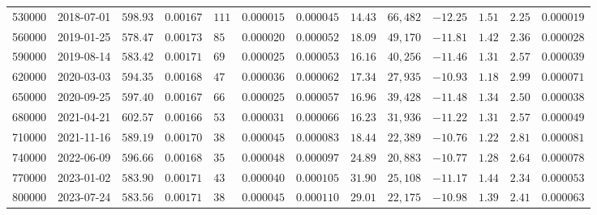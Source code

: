 \begin{tabular}{rllllllllllll}
\toprule
\midrule
530000 & 2018-07-01 & $598.93$ & $0.00167$ & $111$ & $0.000015$ & $0.000045$ & $14.43$ & $66,482$ & $-12.25$ & $1.51$ & $2.25$ & $0.000019$ \\
560000 & 2019-01-25 & $578.47$ & $0.00173$ & $85$ & $0.000020$ & $0.000052$ & $18.09$ & $49,170$ & $-11.81$ & $1.42$ & $2.36$ & $0.000028$ \\
590000 & 2019-08-14 & $583.42$ & $0.00171$ & $69$ & $0.000025$ & $0.000053$ & $16.16$ & $40,256$ & $-11.46$ & $1.31$ & $2.57$ & $0.000039$ \\
620000 & 2020-03-03 & $594.35$ & $0.00168$ & $47$ & $0.000036$ & $0.000062$ & $17.34$ & $27,935$ & $-10.93$ & $1.18$ & $2.99$ & $0.000071$ \\
650000 & 2020-09-25 & $597.40$ & $0.00167$ & $66$ & $0.000025$ & $0.000057$ & $16.96$ & $39,428$ & $-11.48$ & $1.34$ & $2.50$ & $0.000038$ \\
680000 & 2021-04-21 & $602.57$ & $0.00166$ & $53$ & $0.000031$ & $0.000066$ & $16.23$ & $31,936$ & $-11.22$ & $1.31$ & $2.57$ & $0.000049$ \\
710000 & 2021-11-16 & $589.19$ & $0.00170$ & $38$ & $0.000045$ & $0.000083$ & $18.44$ & $22,389$ & $-10.76$ & $1.22$ & $2.81$ & $0.000081$ \\
740000 & 2022-06-09 & $596.66$ & $0.00168$ & $35$ & $0.000048$ & $0.000097$ & $24.89$ & $20,883$ & $-10.77$ & $1.28$ & $2.64$ & $0.000078$ \\
770000 & 2023-01-02 & $583.90$ & $0.00171$ & $43$ & $0.000040$ & $0.000105$ & $31.90$ & $25,108$ & $-11.17$ & $1.44$ & $2.34$ & $0.000053$ \\
800000 & 2023-07-24 & $583.56$ & $0.00171$ & $38$ & $0.000045$ & $0.000110$ & $29.01$ & $22,175$ & $-10.98$ & $1.39$ & $2.41$ & $0.000063$ \\
\bottomrule
\end{tabular}

